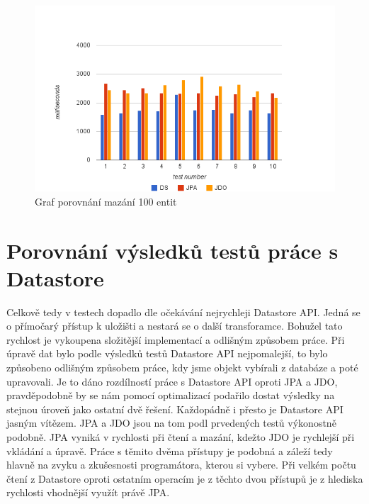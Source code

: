 \begin{figure}[h]
\begin{center}
\includegraphics[width=6.5in]{figures/delete.png}
\caption{Graf porovnání mazání 100 entit}
\label{fig:delete}
\end{center}
\end{figure}

\section{Porovnání výsledků testů práce s Datastore}
Celkově tedy v testech dopadlo dle očekávání nejrychleji Datastore API. Jedná se o přímočarý přístup k uložišti a nestará se o další transforamce. Bohužel tato rychlost je vykoupena složitější implementací a odlišným způsobem práce. Při úpravě dat bylo podle výsledků testů Datastore API nejpomalejší, to bylo způsobeno odlišným způsobem práce, kdy jsme objekt vybírali z databáze a poté upravovali. Je to dáno rozdílností práce s Datastore API oproti JPA a JDO, pravděpodobně by se nám pomocí optimalizací podařilo dostat výsledky na stejnou úroveň jako ostatní dvě řešení. Každopádně i přesto je Datastore API jasným vítězem. JPA a JDO jsou na tom podl prvedených testů výkonostně podobně. JPA vyniká v rychlosti při čtení a mazání, kdežto JDO je rychlejší při vkládání a úpravě. Práce s těmito dvěma přístupy je podobná a záleží tedy hlavně na zvyku a zkušesnosti programátora, kterou si vybere. Při velkém počtu čtení z Datastore oproti ostatním operacím je z těchto dvou přístupů je z hlediska rychlosti vhodnější využít právě JPA.